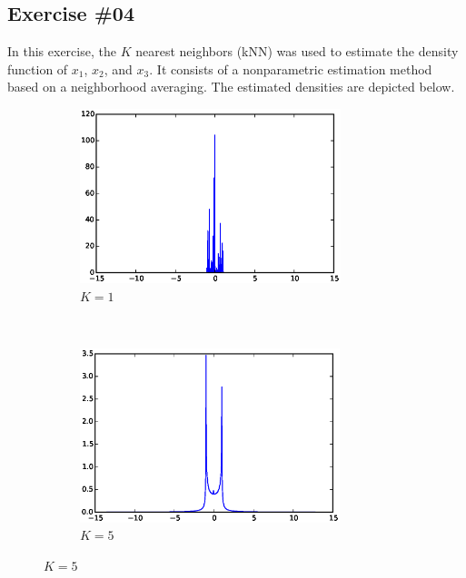 \documentclass[a4paper,12pt]{article}
\begin{document}
\cleardoublepage
\subsection*{Exercise \#04}
In this exercise, the $K$ nearest neighbors (kNN) was used to estimate the density function of $x_1$, $x_2$, and $x_3$. It consists of a nonparametric estimation method based on a neighborhood averaging. The estimated densities are depicted below.

\begin{figure}[h]
    \centering
    \begin{subfigure}[t]{0.5\textwidth} 
        \centering
        \includegraphics[height=2in]{figures/knn_x1_1.eps}
        \caption{$K=1$}
    \end{subfigure}%
    ~  %
    \begin{subfigure}[t]{0.5\textwidth}
        \centering
        \includegraphics[height=2in]{figures/knn_x1_5.eps}
        \caption{$K=5$}
    \end{subfigure}%


\end{figure}
\end{document}
